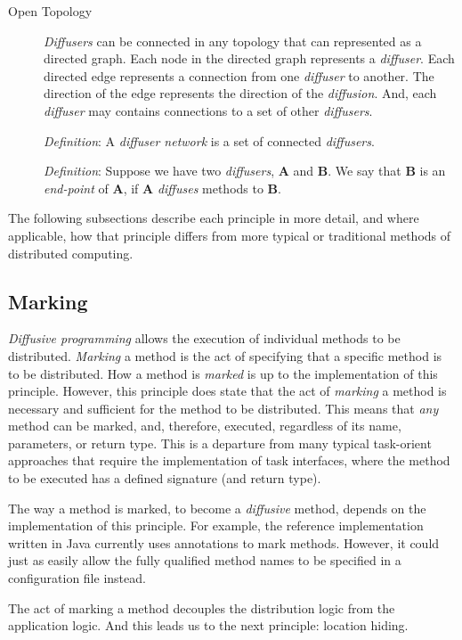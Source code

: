 \documentclass[11pt]{scrartcl}
\begin{document}
\begin{description}
	\item[Open Topology]
	\emph{Diffusers} can be connected in any topology that can represented as a directed graph. Each node in the directed graph represents a \emph{diffuser}. Each directed edge represents a connection from one \emph{diffuser} to another. The direction of the edge represents the direction of the \emph{diffusion}. And, each \emph{diffuser} may contains connections to a set of other \emph{diffusers}. 
	
	\emph{Definition}: A \emph{diffuser network} is a set of connected \emph{diffusers}.
	
	\emph{Definition}: Suppose we have two \emph{diffusers}, \textbf{A} and \textbf{B}. We say that \textbf{B} is an \emph{end-point} of \textbf{A}, if \textbf{A} \emph{diffuses} methods to \textbf{B}.

\end{description}

The following subsections describe each principle in more detail, and where applicable, how that principle differs from more typical or traditional methods of distributed computing.

\subsection{Marking\label{sec:marking}}
\emph{Diffusive programming} allows the execution of individual methods to be distributed. \emph{Marking} a method is the act of specifying that a specific method is to be distributed. How a method is \emph{marked} is up to the implementation of this principle. However, this principle does state that the act of \emph{marking} a method is necessary and sufficient for the method to be distributed. This means that \emph{any} method can be marked, and, therefore, executed, regardless of its name, parameters, or return type. This is a departure from many typical task-orient approaches that require the implementation of task interfaces, where the method to be executed has a defined signature (and return type).

The way a method is marked, to become a \emph{diffusive} method, depends on the implementation of this principle. For example, the reference implementation written in Java currently uses annotations to mark methods. However, it could just as easily allow the fully qualified method names to be specified in a configuration file instead.

The act of marking a method decouples the distribution logic from the application logic. And this leads us to the next principle: location hiding.
\end{document}
